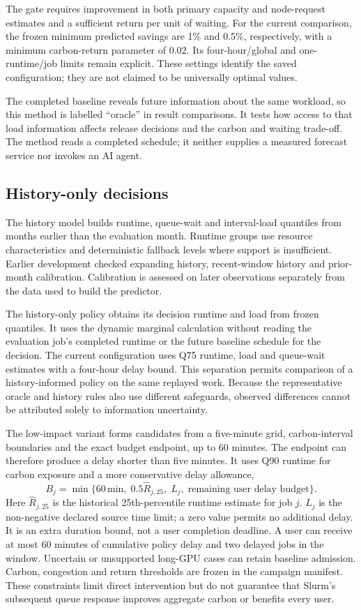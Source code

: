 The gate requires improvement in both primary capacity and node-request estimates and a sufficient return per unit of waiting. For the current comparison, the frozen minimum predicted savings are 1\% and 0.5\%, respectively, with a minimum carbon-return parameter of 0.02. Its four-hour/global and one-runtime/job limits remain explicit. These settings identify the saved configuration; they are not claimed to be universally optimal values.

The completed baseline reveals future information about the same workload, so this method is labelled ``oracle'' in result comparisons. It tests how access to that load information affects release decisions and the carbon and waiting trade-off. The method reads a completed schedule; it neither supplies a measured forecast service nor invokes an AI agent.

\subsection{History-only decisions}
The history model builds runtime, queue-wait and interval-load quantiles from months earlier than the evaluation month. Runtime groups use resource characteristics and deterministic fallback levels where support is insufficient. Earlier development checked expanding history, recent-window history and prior-month calibration. Calibration is assessed on later observations separately from the data used to build the predictor.

The history-only policy obtains its decision runtime and load from frozen quantiles. It uses the dynamic marginal calculation without reading the evaluation job's completed runtime or the future baseline schedule for the decision. The current configuration uses Q75 runtime, load and queue-wait estimates with a four-hour delay bound. This separation permits comparison of a history-informed policy on the same replayed work. Because the representative oracle and history rules also use different safeguards, observed differences cannot be attributed solely to information uncertainty.

The low-impact variant forms candidates from a five-minute grid, carbon-interval boundaries and the exact budget endpoint, up to 60 minutes. The endpoint can therefore produce a delay shorter than five minutes. It uses Q90 runtime for carbon exposure and a more conservative delay allowance,
\begin{equation}
B_j=\min\{60\,\mathrm{min},\;0.5\widehat R_{j,25},\;
L_j,\;\text{remaining user delay budget}\}.
\end{equation}
Here $\widehat R_{j,25}$ is the historical 25th-percentile runtime estimate for job $j$. $L_j$ is the non-negative declared source time limit; a zero value permits no additional delay. It is an extra duration bound, not a user completion deadline. A user can receive at most 60 minutes of cumulative policy delay and two delayed jobs in the window. Uncertain or unsupported long-GPU cases can retain baseline admission. Carbon, congestion and return thresholds are frozen in the campaign manifest. These constraints limit direct intervention but do not guarantee that Slurm's subsequent queue response improves aggregate carbon or benefits every user.

